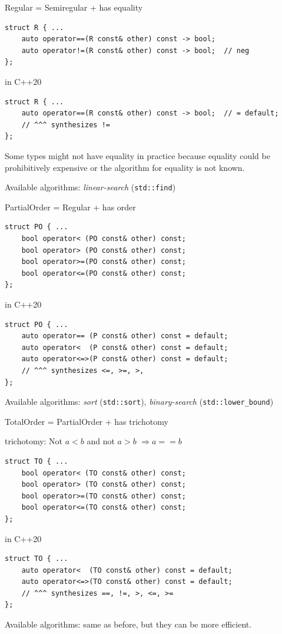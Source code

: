 \begin{frame}[fragile]{Regular = Semiregular + has equality}

	\begin{lstlisting}
struct R { ...
	auto operator==(R const& other) const -> bool;
	auto operator!=(R const& other) const -> bool;  // neg
};
\end{lstlisting}
	\pause
	in C++20
	\begin{lstlisting}
struct R { ...
	auto operator==(R const& other) const -> bool;  // = default;
	// ^^^ synthesizes !=
};
\end{lstlisting}

Some types might not have equality in practice because equality could be prohibitively expensive or the algorithm for equality is not known.

Available algorithms: \emph{linear-search} (\lstinline{std::find})
\end{frame}

\begin{frame}[fragile]{PartialOrder = Regular + has order}

	\begin{lstlisting}
struct PO { ...
	bool operator< (PO const& other) const;
	bool operator> (PO const& other) const;
	bool operator>=(PO const& other) const;
	bool operator<=(PO const& other) const;
};
\end{lstlisting}
	\pause
	in C++20
	\begin{lstlisting}
struct PO { ...
	auto operator== (P const& other) const = default;
	auto operator<  (P const& other) const = default;
	auto operator<=>(P const& other) const = default;
	// ^^^ synthesizes <=, >=, >,
};
\end{lstlisting}

	Available algorithms: \emph{sort} (\lstinline{std::sort}), \emph{binary-search} (\lstinline{std::lower_bound})
\end{frame}

\begin{frame}[fragile]{TotalOrder = PartialOrder + has trichotomy}

trichotomy: Not $a < b$ and not $a > b$ $\Rightarrow a == b$

\begin{lstlisting}
struct TO { ...
	bool operator< (TO const& other) const;
	bool operator> (TO const& other) const;
	bool operator>=(TO const& other) const;
	bool operator<=(TO const& other) const;
};
\end{lstlisting}

	in C++20
	\begin{lstlisting}
struct TO { ...
	auto operator<  (TO const& other) const = default;
	auto operator<=>(TO const& other) const = default;
	// ^^^ synthesizes ==, !=, >, <=, >=
};
\end{lstlisting}

Available algorithms: same as before, but they can be more efficient.

\end{frame}

